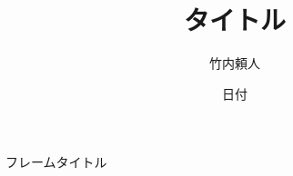 \documentclass[dvipdfmx, 11pt]{beamer}
\title{タイトル}
\author{竹内頼人}
\institute{名古屋大学 大学院情報学研究科 番原研究室}
\date{日付}
\begin{document}
\frame{\titlepage}
\begin{frame}{フレームタイトル}
 
\end{frame}
\end{document}
